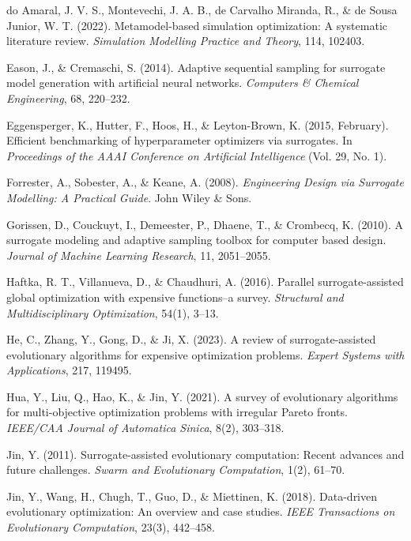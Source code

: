 \documentclass[sigconf,nonacm]{acmart}
\begin{document}
\begin{enumerate}[label={[\arabic*]}]
\item do Amaral, J. V. S., Montevechi, J. A. B., de Carvalho Miranda, R., \& de Sousa Junior, W. T. (2022). Metamodel-based simulation optimization: A systematic literature review. \textit{Simulation Modelling Practice and Theory}, 114, 102403.

\item Eason, J., \& Cremaschi, S. (2014). Adaptive sequential sampling for surrogate model generation with artificial neural networks. \textit{Computers \& Chemical Engineering}, 68, 220--232.

\item Eggensperger, K., Hutter, F., Hoos, H., \& Leyton-Brown, K. (2015, February). Efficient benchmarking of hyperparameter optimizers via surrogates. In \textit{Proceedings of the AAAI Conference on Artificial Intelligence} (Vol. 29, No. 1).

\item Forrester, A., Sobester, A., \& Keane, A. (2008). \textit{Engineering Design via Surrogate Modelling: A Practical Guide}. John Wiley \& Sons.

\item Gorissen, D., Couckuyt, I., Demeester, P., Dhaene, T., \& Crombecq, K. (2010). A surrogate modeling and adaptive sampling toolbox for computer based design. \textit{Journal of Machine Learning Research}, 11, 2051--2055.

\item Haftka, R. T., Villanueva, D., \& Chaudhuri, A. (2016). Parallel surrogate-assisted global optimization with expensive functions--a survey. \textit{Structural and Multidisciplinary Optimization}, 54(1), 3--13.

\item He, C., Zhang, Y., Gong, D., \& Ji, X. (2023). A review of surrogate-assisted evolutionary algorithms for expensive optimization problems. \textit{Expert Systems with Applications}, 217, 119495.

\item Hua, Y., Liu, Q., Hao, K., \& Jin, Y. (2021). A survey of evolutionary algorithms for multi-objective optimization problems with irregular Pareto fronts. \textit{IEEE/CAA Journal of Automatica Sinica}, 8(2), 303--318.

\item Jin, Y. (2011). Surrogate-assisted evolutionary computation: Recent advances and future challenges. \textit{Swarm and Evolutionary Computation}, 1(2), 61--70.

\item Jin, Y., Wang, H., Chugh, T., Guo, D., \& Miettinen, K. (2018). Data-driven evolutionary optimization: An overview and case studies. \textit{IEEE Transactions on Evolutionary Computation}, 23(3), 442--458.


\end{enumerate}
\end{document}
